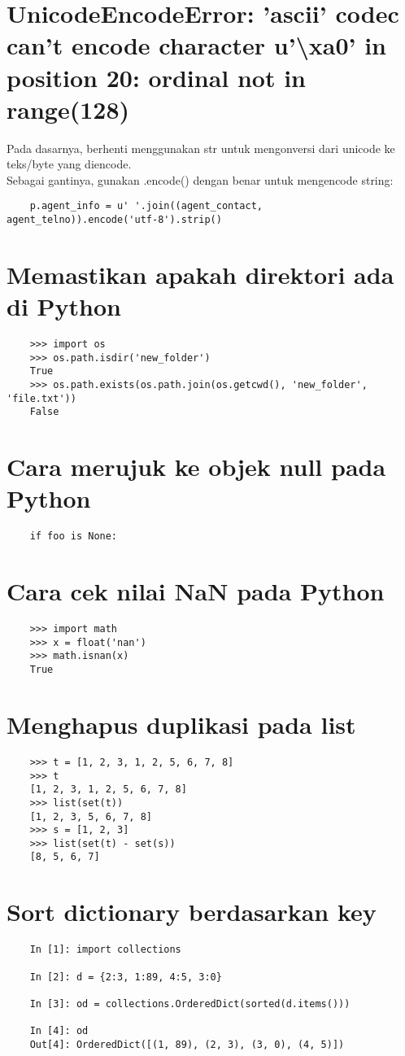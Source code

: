 \documentclass{article}
\begin{document}
	\section {UnicodeEncodeError: 'ascii' codec can't encode character u'\textbackslash xa0' in position 20: ordinal not in range(128)}
Pada dasarnya, berhenti menggunakan str untuk mengonversi dari unicode ke teks/byte yang diencode. \\
Sebagai gantinya, gunakan .encode() dengan benar untuk mengencode string:
\begin{lstlisting}
	p.agent_info = u' '.join((agent_contact, agent_telno)).encode('utf-8').strip()
\end{lstlisting}

\section {Memastikan apakah direktori ada di Python}
\begin{lstlisting}
	>>> import os
	>>> os.path.isdir('new_folder')
	True
	>>> os.path.exists(os.path.join(os.getcwd(), 'new_folder', 'file.txt'))
	False
\end{lstlisting}

\section {Cara merujuk ke objek null pada Python}
\begin{lstlisting}
	if foo is None:
\end{lstlisting}

\section {Cara cek nilai NaN pada Python}
\begin{lstlisting}
	>>> import math
	>>> x = float('nan')
	>>> math.isnan(x)
	True
\end{lstlisting}

\section {Menghapus duplikasi pada list}
\begin{lstlisting}
	>>> t = [1, 2, 3, 1, 2, 5, 6, 7, 8]
	>>> t
	[1, 2, 3, 1, 2, 5, 6, 7, 8]
	>>> list(set(t))
	[1, 2, 3, 5, 6, 7, 8]
	>>> s = [1, 2, 3]
	>>> list(set(t) - set(s))
	[8, 5, 6, 7]
\end{lstlisting}

\section {Sort dictionary berdasarkan key}
\begin{lstlisting}
	In [1]: import collections
	
	In [2]: d = {2:3, 1:89, 4:5, 3:0}
	
	In [3]: od = collections.OrderedDict(sorted(d.items()))
	
	In [4]: od
	Out[4]: OrderedDict([(1, 89), (2, 3), (3, 0), (4, 5)])
\end{lstlisting}
\end{document}
